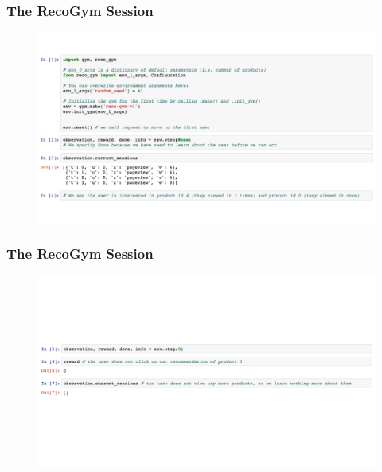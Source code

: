  \begin{frame}
  \frametitle{The RecoGym Session}
 
 
   \begin{figure}[h!]
     \includegraphics[scale=0.3]{images/reco_gym_sess0.png}
       \centering
       \label{motex1}
   \end{figure}
     
 \end{frame}



 \begin{frame}
  \frametitle{The RecoGym Session}
 
 
   \begin{figure}[h!]
     \includegraphics[scale=0.3]{images/reco_gym_sess1.png}
       \centering
       \label{motex1}
   \end{figure}
     
 \end{frame}



